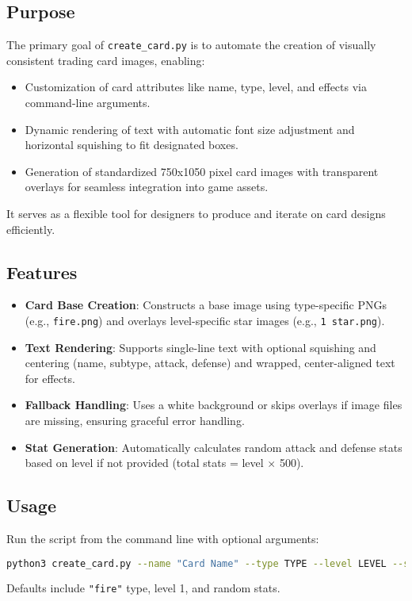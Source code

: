 \subsection{Purpose}
The primary goal of \texttt{create\_card.py} is to automate the creation of visually consistent trading card images, enabling:
\begin{itemize}
	\item Customization of card attributes like name, type, level, and effects via command-line arguments.
	\item Dynamic rendering of text with automatic font size adjustment and horizontal squishing to fit designated boxes.
	\item Generation of standardized 750x1050 pixel card images with transparent overlays for seamless integration into game assets.
\end{itemize}
It serves as a flexible tool for designers to produce and iterate on card designs efficiently.

\subsection{Features}
\begin{itemize}
	\item \textbf{Card Base Creation}: Constructs a base image using type-specific PNGs (e.g., \texttt{fire.png}) and overlays level-specific star images (e.g., \texttt{1 star.png}).
	\item \textbf{Text Rendering}: Supports single-line text with optional squishing and centering (name, subtype, attack, defense) and wrapped, center-aligned text for effects.
	\item \textbf{Fallback Handling}: Uses a white background or skips overlays if image files are missing, ensuring graceful error handling.
	\item \textbf{Stat Generation}: Automatically calculates random attack and defense stats based on level if not provided (total stats = level $\times$ 500).
\end{itemize}

\subsection{Usage}
Run the script from the command line with optional arguments:
\begin{lstlisting}[language=bash]
	python3 create_card.py --name "Card Name" --type TYPE --level LEVEL --subtype SUBTYPE --effect1 "Effect 1" --effect2 "Effect 2" [--attack ATK] [--defense DEF] [--image IMAGE]
\end{lstlisting}
Defaults include \texttt{"fire"} type, level 1, and random stats.

